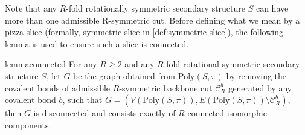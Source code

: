 \documentclass[11pt,letterpaper]{article}  \usepackage[margin=1in]{geometry}
\theoremstyle{definition}  \newtheorem{Definition}[theorem]{Definition}
\newcommand{\PolySpi}{\ensuremath{\mathrm{Poly}(S,\pi)}\xspace}
\begin{document}
Note that any $R$-fold rotationally symmetric secondary structure $S$ can have more than one admissible R-symmetric cut. Before defining what we mean by a pizza slice (formally, symmetric slice in \cref{def:symmetric slice}),  the following lemma is used to  ensure such a slice is  connected.

\begin{restatable} {lemma}{connected} 
	\label{lem:connected}
	For any $R\geq 2$ and any $R$-fold rotational symmetric secondary structure $S$, let $G$ be the graph obtained from $\PolySpi$ by removing the covalent bonds of admissible $R$-symmetric backbone cut $\mathcal{C}_R^b$ generated by any covalent bond $b$, such that $G=(V(\PolySpi), E(\PolySpi)\setminus\mathcal{C}_R^b)$, then $G$ is disconnected and consists exactly of $R$ connected isomorphic components.
\end{restatable}  
\end{document}
